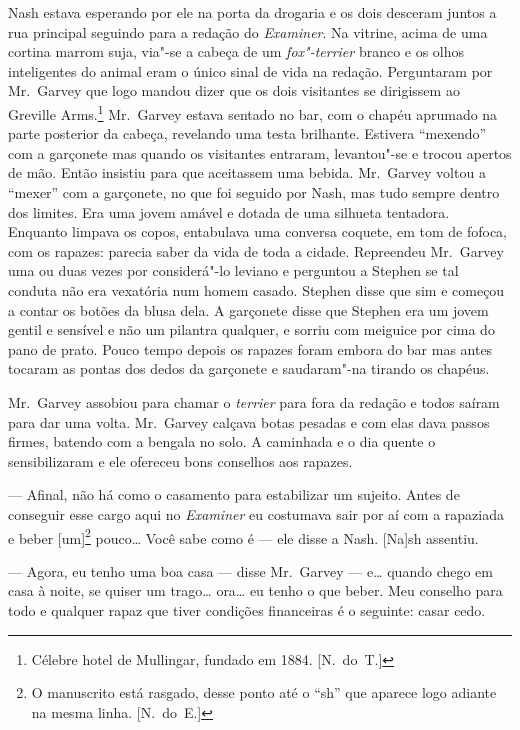 Nash estava esperando por ele na porta da drogaria e os dois
desceram juntos a rua principal seguindo para a redação do
\textit{Examiner}.  Na vitrine, acima de uma cortina marrom suja,
via"-se a cabeça de um \textit{fox"-terrier} branco e
os olhos inteligentes do animal eram o único sinal de vida na redação. 
Perguntaram por Mr.~Garvey que logo mandou dizer que os dois visitantes
se dirigissem ao Greville Arms.\footnote{ Célebre hotel de Mullingar,
fundado em 1884. [N.~do~T.]}   Mr.~Garvey estava sentado no bar, com o
chapéu aprumado na parte posterior da cabeça, revelando uma testa
brilhante.  Estivera “mexendo” com a garçonete mas quando os visitantes
entraram, levantou"-se e trocou apertos de mão.  Então insistiu para que
aceitassem uma bebida.  Mr.~Garvey voltou a “mexer” com a garçonete, no
que foi seguido por Nash, mas tudo sempre dentro dos limites.  Era uma
jovem amável e dotada de uma silhueta tentadora.  Enquanto limpava os
copos, entabulava uma conversa coquete, em tom de fofoca, com os
rapazes: parecia saber da vida de toda a cidade.  Repreendeu Mr.~Garvey
uma ou duas vezes por considerá"-lo leviano e perguntou a Stephen se tal
conduta não era vexatória num homem casado.  Stephen disse que sim e
começou a contar os botões da blusa dela.  A garçonete disse que
Stephen era um jovem gentil e sensível e não um pilantra qualquer, e
sorriu com meiguice por cima do pano de prato.  Pouco tempo depois os
rapazes foram embora do bar mas antes tocaram as pontas dos dedos da
garçonete e saudaram"-na tirando os chapéus.

Mr.~Garvey assobiou para chamar o \textit{terrier} para fora da
redação e todos saíram para dar uma volta.  Mr.~Garvey calçava botas
pesadas e com elas dava passos firmes, batendo com a bengala no solo. 
A caminhada e o dia quente o sensibilizaram e ele ofereceu bons
conselhos aos rapazes.

--- Afinal, não há como o casamento para estabilizar um sujeito. 
Antes de conseguir esse cargo aqui no \textit{Examiner} eu costumava
sair por aí com a rapaziada e beber [um]\footnote{ O manuscrito está
rasgado, desse ponto até o “sh” que aparece logo adiante na mesma
linha. [N.~do~E.]} pouco\ldots{}  Você sabe como é --- ele disse a Nash.  [Na]sh
assentiu.

--- Agora, eu tenho uma boa casa --- disse Mr.~Garvey --- e\ldots{} quando
chego em casa à noite, se quiser um trago\ldots{} ora\ldots{} eu tenho o que
beber.  Meu conselho para todo e qualquer rapaz que tiver condições
financeiras é o seguinte: casar cedo.

